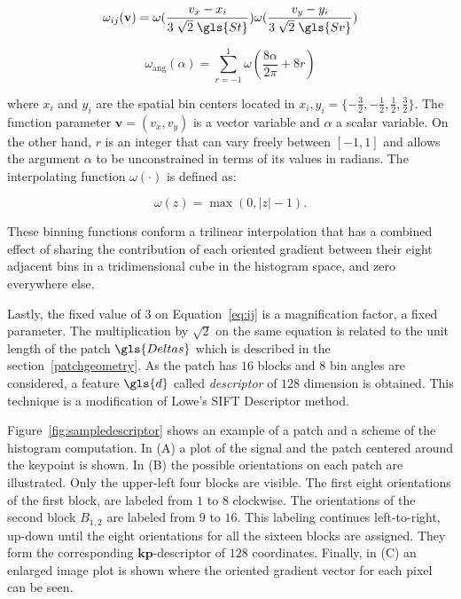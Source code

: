 \begin{equation}
 \omega_{ij}(\mathbf{v}) = \omega( \frac{v_x - x_i}{3 \; \sqrt{2} \; \gls{St}} ) \omega( \frac{v_y - y_i}{3 \; \sqrt{2} \; \gls{Sv}} ) 
\label{eq:ij}
\end{equation}

\begin{equation}
 \omega_\mathrm{ang}(\alpha) = \sum_{r=-1}^{1} \omega( \frac{8\alpha}{2\pi} + 8r)
\label{eq:wang}
\end{equation}

\noindent where $x_i$ and $y_i$ are the spatial bin centers located in $ x_i,y_i = \{-\frac{3}{2},-\frac{1}{2},\frac{1}{2},\frac{3}{2}\} $. The function parameter $\mathbf{v} = ( v_x, v_y ) $ is a vector variable and $\alpha$ a scalar variable.  On the other hand, $r$ is an integer that can vary freely between $\left[ -1,1  \right] $ and allows the argument $\alpha$ to be unconstrained in terms of its values in radians. The interpolating function $\omega(\cdot)$ is defined as:

\begin{equation}
\omega(z) = \max(0,|z|-1).
\label{eq:weighting}
\end{equation}

These binning functions conform a trilinear interpolation that has a combined effect of sharing the contribution of each oriented gradient between their eight adjacent bins in a tridimensional cube in the histogram space, and zero everywhere else.

Lastly, the fixed value of $ 3 $ on Equation~\ref{eq:ij} is a magnification factor, a fixed parameter.  The multiplication by $\sqrt{2}$ on the same equation is related to the unit length of the patch $\gls{Deltas}$ which is described in the section~\ref{patchgeometry}.   As the patch has  $16$ blocks and  $8$ bin angles are considered, a feature $\gls{d}$ called \textit{descriptor} of $128$ dimension is obtained. This technique is a modification of Lowe's SIFT Descriptor method.

Figure~\ref{fig:sampledescriptor} shows an example of a patch and a scheme of the histogram computation. In (A) a plot of the signal and the patch centered around the keypoint is shown. In (B) the possible orientations on each patch are illustrated.  Only the upper-left four blocks are visible.  The first eight orientations of the first block, are labeled from $1$ to $8$ clockwise. The orientations of the second block $ B_{1,2} $ are labeled from $9$ to $16$.  This labeling continues left-to-right, up-down until the eight orientations for all the sixteen blocks are assigned. They form the corresponding $\mathbf{kp}$-descriptor of $128$ coordinates. Finally, in (C) an enlarged image plot is shown where the oriented gradient vector for each pixel can be seen.


